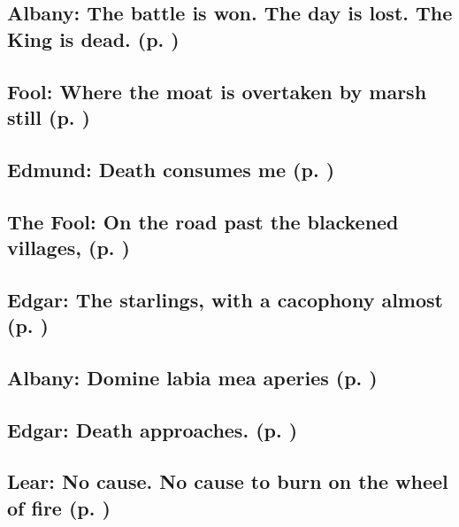 \subsection{Albany: The battle is won. The day is lost. The King is dead. (p. \pageref{ch:lear_bo})}

\subsection{Fool: Where the moat is overtaken by marsh still (p. \pageref{ch:lear_bp})}

\subsection{Edmund: Death consumes me (p. \pageref{ch:lear_bq})}

\subsection{The Fool: On the road past the blackened villages, (p. \pageref{ch:lear_br})}

\subsection{Edgar: The starlings, with a cacophony almost (p. \pageref{ch:lear_bs})}

\subsection{Albany: Domine labia mea aperies (p. \pageref{ch:lear_bt})}

\subsection{Edgar: Death approaches. (p. \pageref{ch:lear_bu})}

\subsection{Lear: No cause. No cause to burn on the wheel of fire (p. \pageref{ch:lear_bv})}

